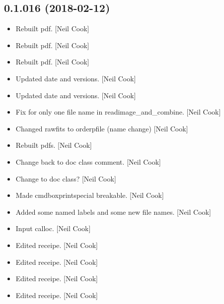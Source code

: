 \documentclass[a4paper,10pt,english]{report}
\begin{document}
\subsection{0.1.016 (2018-02-12)}
\label{\detokenize{misc/changelog:id486}}\begin{itemize}
\item {} 
Rebuilt pdf. {[}Neil Cook{]}

\item {} 
Rebuilt pdf. {[}Neil Cook{]}

\item {} 
Rebuilt pdf. {[}Neil Cook{]}

\item {} 
Updated date and versions. {[}Neil Cook{]}

\item {} 
Updated date and versions. {[}Neil Cook{]}

\item {} 
Fix for only one file name in readimage\_and\_combine. {[}Neil Cook{]}

\item {} 
Changed rawfits to orderpfile (name change) {[}Neil Cook{]}

\item {} 
Rebuilt pdfs. {[}Neil Cook{]}

\item {} 
Change back to doc class comment. {[}Neil Cook{]}

\item {} 
Change to doc class? {[}Neil Cook{]}

\item {} 
Made cmdboxprintspecial breakable. {[}Neil Cook{]}

\item {} 
Added some named labels and some new file names. {[}Neil Cook{]}

\item {} 
Input calloc. {[}Neil Cook{]}

\item {} 
Edited receipe. {[}Neil Cook{]}

\item {} 
Edited receipe. {[}Neil Cook{]}

\item {} 
Edited receipe. {[}Neil Cook{]}

\item {} 
Edited receipe. {[}Neil Cook{]}

\end{itemize}
\end{document}
